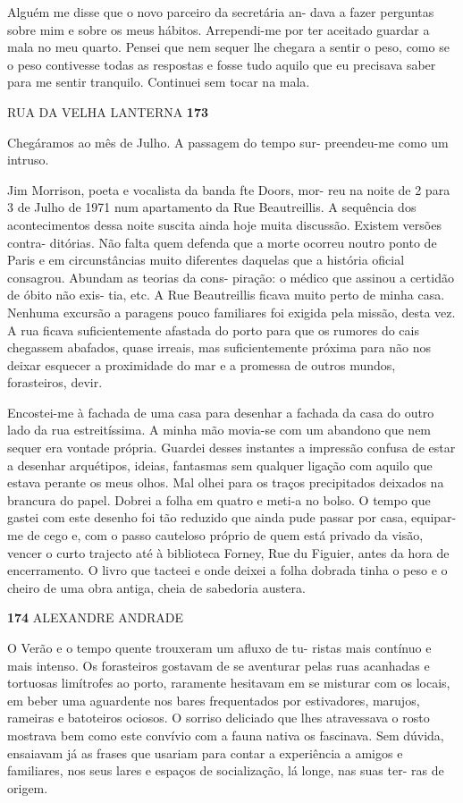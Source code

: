 Alguém me disse que o novo parceiro da secretária an- dava a fazer
perguntas sobre mim e sobre os meus hábitos. Arrependi-me por ter
aceitado guardar a mala no meu quarto. Pensei que nem sequer lhe chegara
a sentir o peso, como se o peso contivesse todas as respostas e fosse
tudo aquilo que eu precisava saber para me sentir tranquilo. Continuei
sem tocar na mala.

RUA DA VELHA LANTERNA \textbf{173}

Chegáramos ao mês de Julho. A passagem do tempo sur- preendeu-me como um
intruso.

Jim Morrison, poeta e vocalista da banda fte Doors, mor- reu na noite de
2 para 3 de Julho de 1971 num apartamento da Rue Beautreillis. A
sequência dos acontecimentos dessa noite suscita ainda hoje muita
discussão. Existem versões contra- ditórias. Não falta quem defenda que
a morte ocorreu noutro ponto de Paris e em circunstâncias muito
diferentes daquelas que a história oficial consagrou. Abundam as teorias
da cons- piração: o médico que assinou a certidão de óbito não exis-
tia, etc. A Rue Beautreillis ficava muito perto de minha casa. Nenhuma
excursão a paragens pouco familiares foi exigida pela missão, desta vez.
A rua ficava suficientemente afastada do porto para que os rumores do
cais chegassem abafados, quase irreais, mas suficientemente próxima para
não nos deixar esquecer a proximidade do mar e a promessa de outros
mundos, forasteiros, devir.

Encostei-me à fachada de uma casa para desenhar a fachada da casa do
outro lado da rua estreitíssima. A minha mão movia-se com um abandono
que nem sequer era vontade própria. Guardei desses instantes a impressão
confusa de estar a desenhar arquétipos, ideias, fantasmas sem qualquer
ligação com aquilo que estava perante os meus olhos. Mal olhei para os
traços precipitados deixados na brancura do papel. Dobrei a folha em
quatro e meti-a no bolso. O tempo que gastei com este desenho foi tão
reduzido que ainda pude passar por casa, equipar-me de cego e, com o
passo cauteloso próprio de quem está privado da visão, vencer o curto
trajecto até à biblioteca Forney, Rue du Figuier, antes da hora de
encerramento. O livro que tacteei e onde deixei a folha dobrada tinha o
peso e o cheiro de uma obra antiga, cheia de sabedoria austera.

\textbf{174 }ALEXANDRE ANDRADE

O Verão e o tempo quente trouxeram um afluxo de tu- ristas mais contínuo
e mais intenso. Os forasteiros gostavam de se aventurar pelas ruas
acanhadas e tortuosas limítrofes ao porto, raramente hesitavam em se
misturar com os locais, em beber uma aguardente nos bares frequentados
por estivadores, marujos, rameiras e batoteiros ociosos. O sorriso
deliciado que lhes atravessava o rosto mostrava bem como este convívio
com a fauna nativa os fascinava. Sem dúvida, ensaiavam já as frases que
usariam para contar a experiência a amigos e familiares, nos seus lares
e espaços de socialização, lá longe, nas suas ter- ras de origem.

